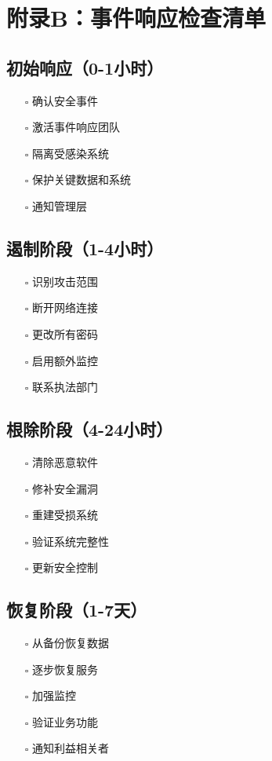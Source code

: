\documentclass[12pt,a4paper]{article}
\begin{document}
\section{附录B：事件响应检查清单}

\subsection{初始响应（0-1小时）}
\begin{itemize}
    \item[$\square$] 确认安全事件
    \item[$\square$] 激活事件响应团队
    \item[$\square$] 隔离受感染系统
    \item[$\square$] 保护关键数据和系统
    \item[$\square$] 通知管理层
\end{itemize}

\subsection{遏制阶段（1-4小时）}
\begin{itemize}
    \item[$\square$] 识别攻击范围
    \item[$\square$] 断开网络连接
    \item[$\square$] 更改所有密码
    \item[$\square$] 启用额外监控
    \item[$\square$] 联系执法部门
\end{itemize}

\subsection{根除阶段（4-24小时）}
\begin{itemize}
    \item[$\square$] 清除恶意软件
    \item[$\square$] 修补安全漏洞
    \item[$\square$] 重建受损系统
    \item[$\square$] 验证系统完整性
    \item[$\square$] 更新安全控制
\end{itemize}

\subsection{恢复阶段（1-7天）}
\begin{itemize}
    \item[$\square$] 从备份恢复数据
    \item[$\square$] 逐步恢复服务
    \item[$\square$] 加强监控
    \item[$\square$] 验证业务功能
    \item[$\square$] 通知利益相关者
\end{itemize}
\end{document}
